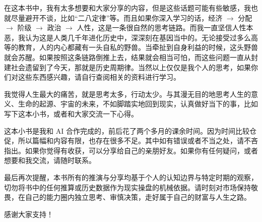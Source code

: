 \documentclass[12pt,openany]{book}
\begin{document}
在这本书中，我有太多想要和大家分享的内容，但是这些话题可能有些敏感，我也就尽量避开不谈，比如“二八定律”等。而且如果你深入学习的话，经济 $\rightarrow$ 分配 $\rightarrow$ 阶级 $\rightarrow$ 政治 $\rightarrow$ 人性，这是一条很自然的思考链路。而我一直坚信人性本恶，我认为这是人类几千年进化历史中，深深刻在基因当中的。无论接受过多么高等的教育，人的内心都藏有一头自私的野兽。当牵扯到自身利益的时候，这头野兽就会苏醒。如果按照这条链路倒推上去，结果就会相当可怕，而这些问题一直从封建社会遗留到了今天，那就是历史周期律。当然以上仅仅是我个人的思考，如果你们对这些东西感兴趣，请自行查阅相关的资料进行学习。

我觉得人生最大的痛苦，就是思考太多，行动太少。与其漫无目的地思考人生的意义、生命的起源、宇宙的未来，不如脚踏实地回到现实，认真做好当下的事，比如写下这本小书，或者和大家交流一下心得。

这本小书是我和 AI 合作完成的，前后花了两个多月的课余时间。因为时间比较仓促，所以篇幅和内容有限，也存在很多不足。其中如有错误或者不当之处，请不吝指出。如果你觉得有收获，可以分享给自己的亲朋好友。如果你有任何疑问，或者想要和我交流，请随时联系。

最后再次提醒，本书所有的推演与分享均基于个人的认知边界与特定时期的观察，切勿将书中的任何推算或历史数据作为现实操盘的机械依据。请时刻对市场保持敬畏，在自己的能力圈内独立思考、审慎决策，走好属于自己的财富与人生之路。

感谢大家支持！
\end{document}
